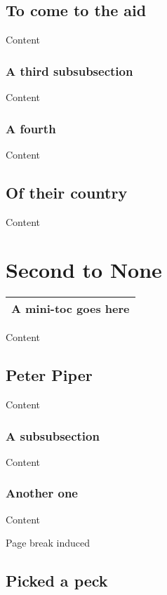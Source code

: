 \documentclass{article}
\newcommand{\insMinitoctab}[2][]{%
    \begin{center}#2
    \begin{tabular}{c}\toprule
    \begin{minipage}[c]{0.8\linewidth}
    \ifMiniTocListings
      \insertminitoc[#1]\else
      \centering\textbf{A mini-toc goes here}\fi
    \end{minipage}\\ \bottomrule
    \end{tabular}
    \end{center}
}
\begin{document}
\subsection{To come to the aid}

Content

\subsubsection{A third subsubsection}

Content

\subsubsection{A fourth}

Content

\subsection{Of their country}

Content


\newpage

\section{Second to None}

\insMinitoctab{\minitocFmt}


Content

\subsection{Peter Piper}

Content

\subsubsection{A subsubsection}

Content

\subsubsection{Another one}

Content

\vfill Page break induced
\newpage


\subsection{Picked a peck}
\end{document}
